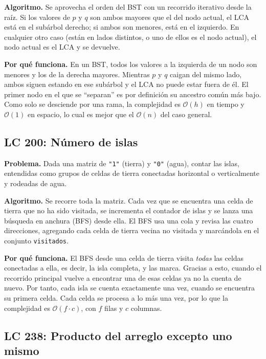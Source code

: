 \documentclass[11pt,letterpaper]{article}
\newcommand{\bigO}[1]{\ensuremath{\mathcal{O}(#1)}}
\begin{document}
\textbf{Algoritmo.} Se aprovecha el orden del BST con un recorrido iterativo desde la raíz. Si los valores de $p$ y $q$ son ambos mayores que el del nodo actual, el LCA está en el subárbol derecho; si ambos son menores, está en el izquierdo. En cualquier otro caso (están en lados distintos, o uno de ellos es el nodo actual), el nodo actual es el LCA y se devuelve.

\textbf{Por qué funciona.} En un BST, todos los valores a la izquierda de un nodo son menores y los de la derecha mayores. Mientras $p$ y $q$ caigan del mismo lado, ambos siguen estando en ese subárbol y el LCA no puede estar fuera de él. El primer nodo en el que se ``separan'' es por definición su ancestro común más bajo. Como solo se desciende por una rama, la complejidad es \bigO{h} en tiempo y \bigO{1} en espacio, lo cual es mejor que el \bigO{n} del caso general.

\subsection{LC 200: Número de islas}

\textbf{Problema.} Dada una matriz de \texttt{"1"} (tierra) y \texttt{"0"} (agua), contar las islas, entendidas como grupos de celdas de tierra conectadas horizontal o verticalmente y rodeadas de agua.

\textbf{Algoritmo.} Se recorre toda la matriz. Cada vez que se encuentra una celda de tierra que no ha sido visitada, se incrementa el contador de islas y se lanza una búsqueda en anchura (BFS) desde ella. El BFS usa una cola y revisa las cuatro direcciones, agregando cada celda de tierra vecina no visitada y marcándola en el conjunto \texttt{visitados}.

\textbf{Por qué funciona.} El BFS desde una celda de tierra visita \emph{todas} las celdas conectadas a ella, es decir, la isla completa, y las marca. Gracias a esto, cuando el recorrido principal vuelve a encontrar una de esas celdas ya no la cuenta de nuevo. Por tanto, cada isla se cuenta exactamente una vez, cuando se encuentra su primera celda. Cada celda se procesa a lo más una vez, por lo que la complejidad es \bigO{f \cdot c}, con $f$ filas y $c$ columnas.

\subsection{LC 238: Producto del arreglo excepto uno mismo}
\end{document}
